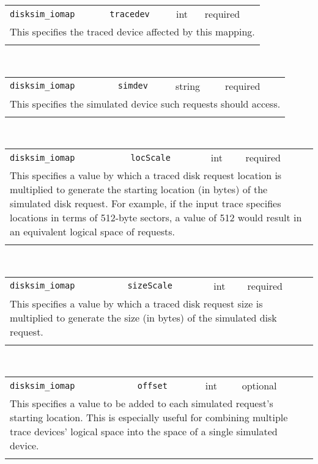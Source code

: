 \noindent 
\begin{tabular}{|p{1.5in}|p{3.5in}|p{0.5in}|p{0.5in}|}
\cline{1-4}
\texttt{disksim\_iomap} & \texttt{tracedev} & int & required \\ 
\cline{1-4}
\multicolumn{4}{|p{6in}|}{
This specifies the traced device affected by this mapping.
}\\ 
\cline{1-4}
\multicolumn{4}{p{5in}}{}\\
\end{tabular}\\ 
\noindent 
\begin{tabular}{|p{1.5in}|p{3.5in}|p{0.5in}|p{0.5in}|}
\cline{1-4}
\texttt{disksim\_iomap} & \texttt{simdev} & string & required \\ 
\cline{1-4}
\multicolumn{4}{|p{6in}|}{
This specifies the simulated device such requests should access.
}\\ 
\cline{1-4}
\multicolumn{4}{p{5in}}{}\\
\end{tabular}\\ 
\noindent 
\begin{tabular}{|p{1.5in}|p{3.5in}|p{0.5in}|p{0.5in}|}
\cline{1-4}
\texttt{disksim\_iomap} & \texttt{locScale} & int & required \\ 
\cline{1-4}
\multicolumn{4}{|p{6in}|}{
This specifies a value by which a traced disk request location is multiplied to
generate the starting location (in bytes) of the simulated disk
request. For example, if the input trace specifies locations in terms
of 512-byte sectors, a value of 512 would result in an equivalent
logical space of requests.
}\\ 
\cline{1-4}
\multicolumn{4}{p{5in}}{}\\
\end{tabular}\\ 
\noindent 
\begin{tabular}{|p{1.5in}|p{3.5in}|p{0.5in}|p{0.5in}|}
\cline{1-4}
\texttt{disksim\_iomap} & \texttt{sizeScale} & int & required \\ 
\cline{1-4}
\multicolumn{4}{|p{6in}|}{
This specifies a value by which a traced disk request size is
multiplied to generate the size (in bytes) of the simulated disk
request.
}\\ 
\cline{1-4}
\multicolumn{4}{p{5in}}{}\\
\end{tabular}\\ 
\noindent 
\begin{tabular}{|p{1.5in}|p{3.5in}|p{0.5in}|p{0.5in}|}
\cline{1-4}
\texttt{disksim\_iomap} & \texttt{offset} & int & optional \\ 
\cline{1-4}
\multicolumn{4}{|p{6in}|}{
This specifies a value to be added to each simulated request's
starting location. This is especially useful for combining multiple
trace devices' logical space into the space of a single simulated
device.
}\\ 
\cline{1-4}
\multicolumn{4}{p{5in}}{}\\
\end{tabular}\\ 
